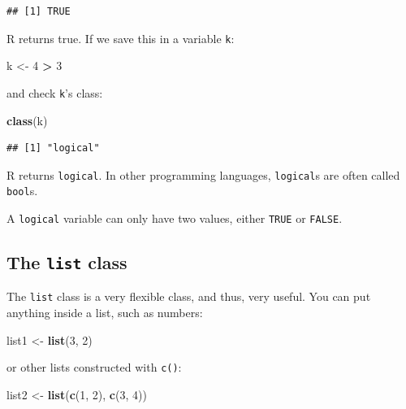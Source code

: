 \documentclass[]{gitbook}
\newenvironment{Shaded}{\begin{snugshade}}{\end{snugshade}}
\newcommand{\DecValTok}[1]{\textcolor[rgb]{0.00,0.00,0.81}{#1}}
\newcommand{\KeywordTok}[1]{\textcolor[rgb]{0.13,0.29,0.53}{\textbf{#1}}}
\newcommand{\NormalTok}[1]{#1}
\newcommand{\OperatorTok}[1]{\textcolor[rgb]{0.81,0.36,0.00}{\textbf{#1}}}
\newcommand{\StringTok}[1]{\textcolor[rgb]{0.31,0.60,0.02}{#1}}
\theoremstyle{definition}
\theoremstyle{definition}
\theoremstyle{definition}
\theoremstyle{remark}
\begin{document}
\begin{verbatim}
## [1] TRUE
\end{verbatim}

R returns true. If we save this in a variable \texttt{k}:

\begin{Shaded}
\begin{Highlighting}[]
\NormalTok{k <-}\StringTok{ }\DecValTok{4} \OperatorTok{>}\StringTok{ }\DecValTok{3}
\end{Highlighting}
\end{Shaded}

and check \texttt{k}'s class:

\begin{Shaded}
\begin{Highlighting}[]
\KeywordTok{class}\NormalTok{(k)}
\end{Highlighting}
\end{Shaded}

\begin{verbatim}
## [1] "logical"
\end{verbatim}

R returns \texttt{logical}. In other programming languages,
\texttt{logical}s are often called \texttt{bool}s.

A \texttt{logical} variable can only have two values, either
\texttt{TRUE} or \texttt{FALSE}.

\hypertarget{the-list-class}{%
\subsection{\texorpdfstring{The \texttt{list}
class}{The list class}}\label{the-list-class}}

The \texttt{list} class is a very flexible class, and thus, very useful.
You can put anything inside a list, such as numbers:

\begin{Shaded}
\begin{Highlighting}[]
\NormalTok{list1 <-}\StringTok{ }\KeywordTok{list}\NormalTok{(}\DecValTok{3}\NormalTok{, }\DecValTok{2}\NormalTok{)}
\end{Highlighting}
\end{Shaded}

or other lists constructed with \texttt{c()}:

\begin{Shaded}
\begin{Highlighting}[]
\NormalTok{list2 <-}\StringTok{ }\KeywordTok{list}\NormalTok{(}\KeywordTok{c}\NormalTok{(}\DecValTok{1}\NormalTok{, }\DecValTok{2}\NormalTok{), }\KeywordTok{c}\NormalTok{(}\DecValTok{3}\NormalTok{, }\DecValTok{4}\NormalTok{))}
\end{Highlighting}
\end{Shaded}
\end{document}
